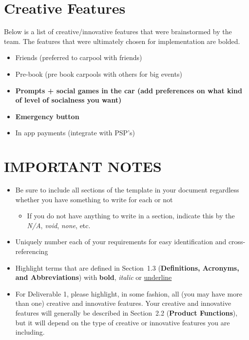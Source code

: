 \documentclass[]{article}
\begin{document}
\section{Creative Features}
\label{sec:creative_features}
Below is a list of creative/innovative features that were brainstormed by the team. The features that were ultimately chosen for implementation are bolded.
\begin{itemize}
	\item Friends (preferred to carpool with friends)
	\item Pre-book (pre book carpools with others for big events)
	\item \textbf{Prompts + social games in the car (add preferences on what kind of level of socialness you want)} 
	\item \textbf{Emergency button}
	\item In app payments (integrate with PSP's) 

\end{itemize}

\newpage
\section*{IMPORTANT NOTES}
\begin{itemize}
	\item Be sure to include all sections of the template in your document regardless whether you have something to write for each or not
	\begin{itemize}
		\item If you do not have anything to write in a section, indicate this by the \emph{N/A}, \emph{void}, \emph{none}, etc.
	\end{itemize}
	\item Uniquely number each of your requirements for easy identification and cross-referencing
	\item Highlight terms that are defined in Section~1.3 (\textbf{Definitions, Acronyms, and Abbreviations}) with \textbf{bold}, \emph{italic} or \underline{underline}
	\item For Deliverable 1, please highlight, in some fashion, all (you may have more than one) creative and innovative features. Your creative and innovative features will generally be described in Section~2.2 (\textbf{Product Functions}), but it will depend on the type of creative or innovative features you are including.
\end{itemize}
\end{document}
